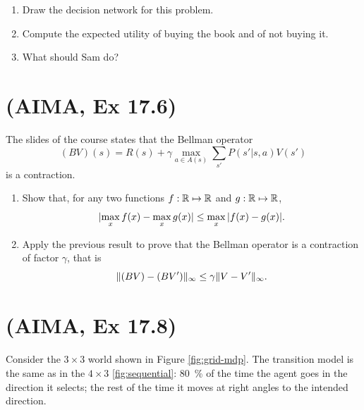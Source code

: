 \documentclass[11pt, a4paper]{article}
\begin{document}
\begin{enumerate}
    \item Draw the decision network for this problem.

    \item Compute the expected utility of buying the book and of not buying it.

    \item What should Sam do?
\end{enumerate}

\newpage

\section{(AIMA, Ex 17.6)}

The slides of the course states that the Bellman operator
\begin{equation*}
    (B V)(s) = R(s) + \gamma \max_{a \in A(s)} \sum_{s'} P(s' | s, a) V(s')
\end{equation*}
is a contraction.

\begin{enumerate}
    \item Show that, for any two functions $f: \mathbb{R} \mapsto \mathbb{R}$ and $g: \mathbb{R} \mapsto \mathbb{R}$,
    \begin{equation*}
        \lvert\max_x f(x) - \max_x g(x)\rvert \leq \max_x \, \lvert f(x) - g(x)\rvert .
    \end{equation*}

    \item Apply the previous result to prove that the Bellman operator is a contraction of factor $\gamma$, that is
    \begin{equation*}
        \lVert(BV) - (BV')\rVert_\infty \leq \gamma \lVert V - V'\rVert_\infty .
    \end{equation*}
\end{enumerate}

\newpage

\section{(AIMA, Ex 17.8)} \label{sec:17.8}

Consider the $3 \times 3$ world shown in Figure \ref{fig:grid-mdp}. The transition model is the same as in the $4 \times 3$ \ref{fig:sequential}: \qty{80}{\percent} of the time the agent goes in the direction it selects; the rest of the time it moves at right angles to the intended direction.
\end{document}

